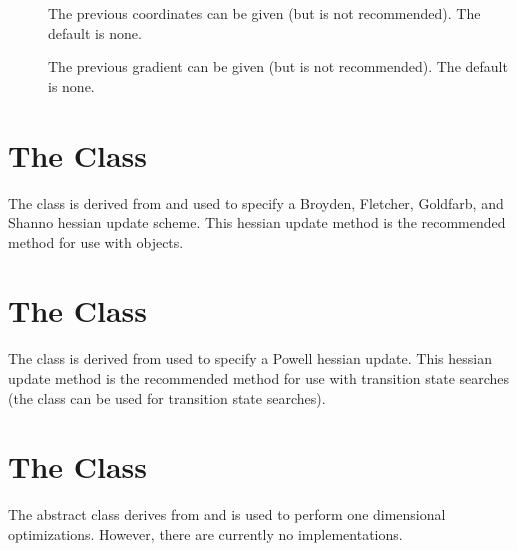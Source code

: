 \begin{description}
  \item[] The previous coordinates can be given (but is not
    recommended).  The default is none.

  \item[] The previous gradient can be given (but is not
    recommended).  The default is none.

\end{description}


\section{The  Class}\label{BFGSUpdate}

The  class is derived from  and used
to specify a Broyden, Fletcher, Goldfarb, and Shanno hessian update scheme.
This hessian update method is the recommended method for use with
 objects.


\section{The  Class}\label{PowellUpdate}

The  class is derived from 
used to specify a Powell hessian update.  This hessian update method is the
recommended method for use with transition state searches (the
 class can be used for transition state searches).


\section{The  Class}\label{LineOpt}

The  abstract class derives from  and is
used to perform one dimensional optimizations.  However, there are
currently no implementations.


